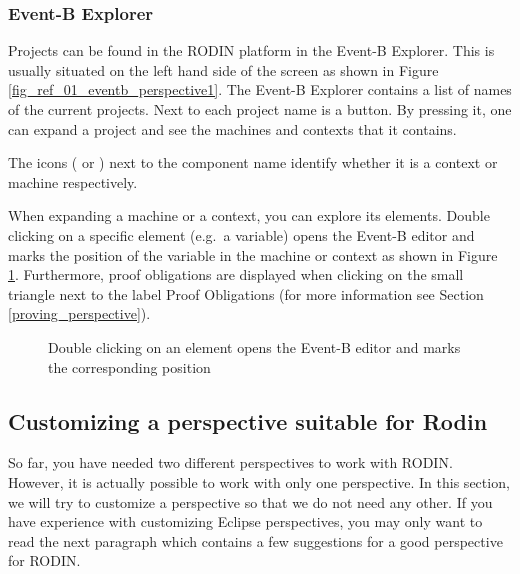 \subsubsection{Event-B Explorer}
\label{eventb_explorer}

Projects can be found in the RODIN platform in the \textsf{Event-B Explorer}. This is usually situated on the left hand side of the screen as shown in Figure \ref{fig_ref_01_eventb_perspective1}. The \textsf{Event-B Explorer} contains a list of names of the current projects. Next to each project name is a  button. By pressing it, one can expand a project and see the machines and contexts that it contains.

The icons ( or ) next to the component name identify whether it is a context or machine respectively.

When expanding a machine or a context, you can explore its elements. Double clicking on a specific element (e.g.\ a variable) opens the Event-B editor and marks the position of the variable in the machine or context as shown in Figure \ref{fig_ref_01_project_explorer1}. Furthermore, proof obligations are displayed when clicking on the small triangle next to the label \textsf{Proof Obligations} (for more information see Section \ref{proving_perspective}).

\begin{figure}[!ht]
\begin{center}
	\caption{Double clicking on an element opens the Event-B editor and marks the corresponding position}
	\label{fig_ref_01_project_explorer1}
\end{center}
\end{figure}

\subsection{Customizing a perspective suitable for Rodin}
\label{customizing_a_perspective_suitable_for_rodin}

So far, you have needed two different perspectives to work with RODIN. However, it is actually possible to work with only one perspective. In this section, we will try to customize a perspective so that we do not need any other. If you have experience with customizing Eclipse perspectives, you may only want to read the next paragraph which contains a few suggestions for a good perspective for RODIN.

